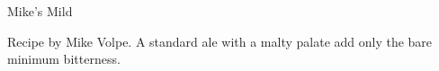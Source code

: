 \begin{recipe}{Mike's Mild} %

\begin{aboutblock}
Recipe by Mike Volpe. A standard ale with a malty palate add only the bare
minimum bitterness. 
\end{aboutblock}


\begin{methodandtiming}
 
\begin{mashsteps}
\end{mashsteps}

\begin{fermentationsteps}
\end{fermentationsteps}

\end{methodandtiming}

\recipebreak

\begin{ingredientsblock}

\begin{malts}
\end{malts}

\begin{hops}
\end{hops}


\end{ingredientsblock}

\end{recipe}

